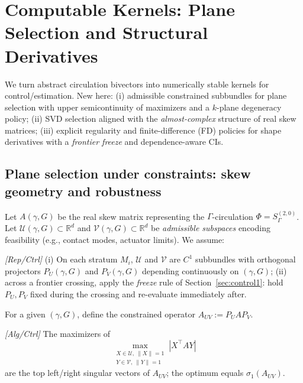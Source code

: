 \section{Computable Kernels: Plane Selection and Structural Derivatives}\label{sec:kernels1}

We turn abstract circulation bivectors into numerically stable kernels for control/estimation. New here:
(i) admissible constrained subbundles for plane selection with upper semicontinuity of maximizers and a $k$-plane degeneracy policy; 
(ii) SVD selection aligned with the \emph{almost-complex} structure of real skew matrices; 
(iii) explicit regularity and finite-difference (FD) policies for shape derivatives with a \emph{frontier freeze} and dependence-aware CIs.

\setcounter{lemma}{10}
\setcounter{proposition}{1}

\subsection{Plane selection under constraints: skew geometry and robustness}\label{subsec:plane}

Let $A(\gamma,G)$ be the real skew matrix representing the $\Gamma$-circulation $\Phi=S^{(2,0)}_\Gamma$. 
Let $\mathcal U(\gamma,G)\subset \mathbb R^d$ and $\mathcal V(\gamma,G)\subset \mathbb R^d$ be \emph{admissible subspaces} encoding feasibility (e.g., contact modes, actuator limits). 
We assume:

\begin{assumption}\label{ass:admissible}
\emph{[\textup{Rep/Ctrl}]}
(i) On each stratum $M_i$, $\mathcal U$ and $\mathcal V$ are $C^1$ subbundles with orthogonal projectors $P_U(\gamma,G)$ and $P_V(\gamma,G)$ depending continuously on $(\gamma,G)$; 
(ii) across a frontier crossing, apply the \emph{freeze} rule of Section~\ref{sec:control1}: hold $P_U,P_V$ fixed during the crossing and re-evaluate immediately after.
\end{assumption}

For a given $(\gamma,G)$, define the constrained operator $A_{UV}:=P_U A P_V$.

\begin{lemma}\label{lem:constrained-svd-7}
\emph{[\textup{Alg/Ctrl}]}
The maximizers of 
\[
\max_{\substack{X\in\mathcal U,\ \|X\|=1\\ Y\in\mathcal V,\ \|Y\|=1}} |X^\top A Y|
\]
are the top left/right singular vectors of $A_{UV}$; the optimum equals $\sigma_1(A_{UV})$.
\end{lemma}

